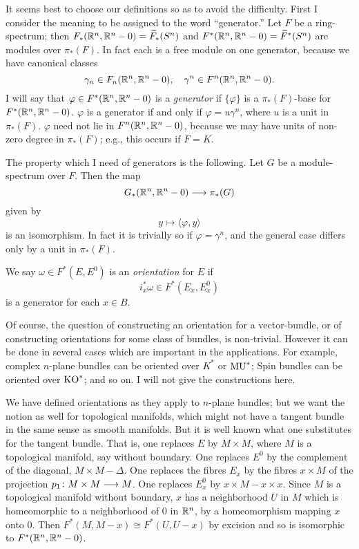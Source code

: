 \documentclass[../main]{subfiles}
\begin{document}
It seems best to choose our definitions so as to avoid the difficulty. First I consider the meaning to be assigned to the word ``generator.'' Let $F$ be a ring-spectrum; then $F_*(\mathbb{R}^n,\mathbb{R}^n-0) = \widetilde{F}_*(S^n)$ and $F^*(\mathbb{R}^n,\mathbb{R}^n-0) = \widetilde{F}^*(S^n)$ are modules over $\pi_*(F)$. In fact each is a free module on one generator, because we have canonical classes
\[
	\gamma_n \in F_n(\mathbb{R}^n,\mathbb{R}^n-0), \quad \gamma^n \in F^n(\mathbb{R}^n, \mathbb{R}^n - 0).
\]
I will say that $\varphi \in F^*(\mathbb{R}^n,\mathbb{R}^n-0)$ is a \emph{generator}  if $\{\varphi\}$ is a $\pi_*(F)$-base for $F^*(\mathbb{R}^n,\mathbb{R}^n-0)$. $\varphi$ is a generator if and only if $\varphi = u \gamma^n$, where $u$ is a unit in $\pi_*(F)$. $\varphi$ need not lie in $F^n(\mathbb{R}^n,\mathbb{R}^n-0)$, because we may have units of non-zero degree in $\pi_*(F)$; e.g., this occurs if $F=K$.

The property which I need of generators is the following. Let $G$ be a module-spectrum over $F$. Then the map \[G_*(\mathbb{R}^n,\mathbb{R}^n-0) \longrightarrow \pi_*(G)\]
given by 
\[y \mapsto  \langle \varphi , y \rangle\]
is an isomorphism. In fact it is trivially so if $\varphi = \gamma^n$, and the general case differs only by a unit in $\pi_*(F)$.

We say $\omega \in  F^*(E,E^0)$ is an \emph{orientation}  for $E$ if
\[i_x^* \omega \in F^*(E_x,E_x^0)\]
is a generator for each $x \in B$.

Of course, the question of constructing an orientation for a vector-bundle, or of constructing orientations for some class of bundles, is non-trivial. However it can be done in several cases which are important in the applications. For example, complex $n$-plane bundles can be oriented over $K^*$ or $\mathrm{MU}^*$; Spin bundles can be oriented over $\mathrm{KO}^*$; and so on. I will not give the constructions here.

We have defined orientations as they apply to $n$-plane bundles; but we want the notion as well for topological manifolds, which might not have a tangent bundle in the same sense as smooth manifolds. But it is well known what one substitutes for the tangent bundle. That is, one replaces $E$ by $M \times M$, where $M$ is a topological manifold, say without boundary. One replaces $E^0$ by the complement of the diagonal, $M \times M - \Delta$. One replaces the fibres $E_x$ by the fibres $x \times M$ of the projection $p_1 \colon M \times M \longrightarrow M$. One replaces $E^0_x$ by $x \times M - x \times x$. Since $M$ is a topological manifold without boundary, $x$ has a neighborhood $U$ in $M$ which is homeomorphic to a neighborhood of 0 in $\mathbb{R}^n$, by a homeomorphism mapping $x$ onto 0. Then $F^*(M,M-x) \cong F^*(U,U-x)$ by excision and so is isomorphic to $F^*(\mathbb{R}^n,\mathbb{R}^n - 0)$.
\end{document}
